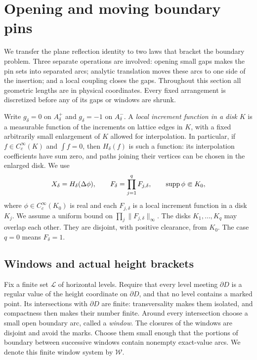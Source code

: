 \section{Opening and moving boundary pins}\label{sec:pins}

We transfer the plane reflection identity to two laws that bracket the
boundary problem.  Three separate operations are involved: opening small
gaps makes the pin sets into separated arcs; analytic translation moves
these arcs to one side of the insertion; and a local coupling closes the
gaps.  Throughout this section all geometric lengths are in physical
coordinates.  Every fixed arrangement is discretized before any of its
gaps or windows are shrunk.

Write $g_\delta=0$ on $A^+_\delta$ and $g_\delta=-1$ on
$A^-_\delta$.  A \emph{local increment function in a disk $K$} is a
measurable function of the increments on lattice edges in $K$, with a
fixed arbitrarily small enlargement of $K$ allowed for interpolation.
In particular, if $f\in C_c^\infty(K)$ and $\int f=0$, then
$H_\delta(f)$ is such a function: its interpolation coefficients have
sum zero, and paths joining their vertices can be chosen in the enlarged
disk.  We use
\begin{equation}\label{eq:pins-insertion}
 X_\delta=H_\delta(\Delta\phi),\qquad
 F_\delta=\prod_{j=1}^q F_{j,\delta},\qquad
 \operatorname{supp}\phi\Subset K_0,
\end{equation}
where $\phi\in C_c^\infty(K_0)$ is real and each $F_{j,\delta}$ is a local
increment function in a disk $K_j$.  We assume a uniform bound on
$\prod_j\|F_{j,\delta}\|_\infty$.  The disks $K_1,\ldots,K_q$
may overlap each other.  They are disjoint, with positive clearance,
from $K_0$.  The case $q=0$ means $F_\delta=1$.

\subsection{Windows and actual height brackets}

Fix a finite set $\mathcal L$ of horizontal levels.  Require that every
level meeting $\partial D$ is a regular value of the height coordinate
on $\partial D$, and that no level contains a marked point.  Its
intersections with $\partial D$ are finite: transversality makes them
isolated, and compactness then makes their number finite.  Around every
intersection choose a small open boundary arc, called a \emph{window}.
The closures of the windows are disjoint and avoid the marks.  Choose
them small enough that the portions of boundary between successive
windows contain nonempty exact-value arcs.  We denote this finite
window system by $\mathcal W$.

